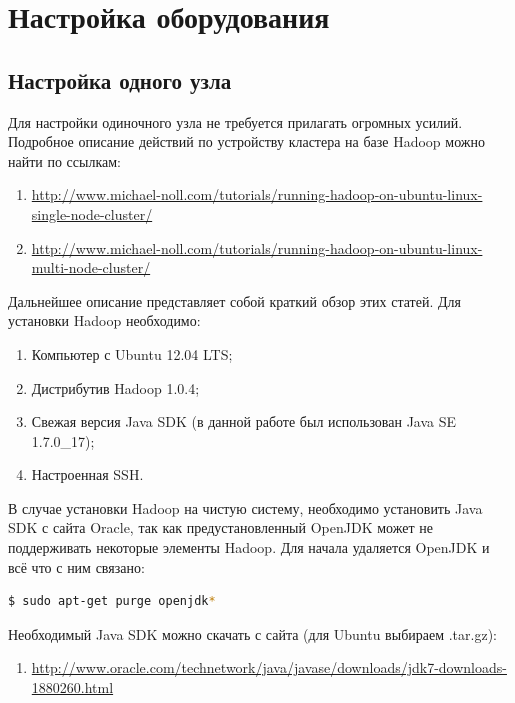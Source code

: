 \documentclass[12pt,a4paper]{extarticle} %
\begin{document}
\clearpage\newpage
\section{Настройка оборудования} \label{sec:TuningCluster}
\subsection{Настройка одного узла}

    Для настройки одиночного узла не требуется прилагать огромных усилий. Подробное описание действий по устройству кластера на базе Hadoop можно найти по ссылкам:
\begin{enumerate}
    \item[] \href{http://www.michael-noll.com/tutorials/running-hadoop-on-ubuntu-linux-single-node-cluster/}{http://www.michael-noll.com/tutorials/running-hadoop-on-ubuntu-linux-single-node-cluster/}
    \item[] \href{http://www.michael-noll.com/tutorials/running-hadoop-on-ubuntu-linux-multi-node-cluster/}{http://www.michael-noll.com/tutorials/running-hadoop-on-ubuntu-linux-multi-node-cluster/}
\end{enumerate}

    Дальнейшее описание представляет собой краткий обзор этих статей. Для установки Hadoop необходимо:
\begin{enumerate}
    \item Компьютер с Ubuntu 12.04 LTS;
    \item Дистрибутив Hadoop 1.0.4;
    \item Свежая версия Java SDK (в данной работе был использован Java SE 1.7.0\_17);
    \item Настроенная SSH.
\end{enumerate}

    В случае установки Hadoop на чистую систему, необходимо установить Java SDK с сайта Oracle, так как предустановленный OpenJDK может не поддерживать некоторые элементы Hadoop.
\noindent Для начала удаляется OpenJDK и всё что с ним связано:
\begin{lstlisting}[language=sh]
    $ sudo apt-get purge openjdk*
\end{lstlisting}

\noindent Необходимый Java SDK можно скачать с сайта (для Ubuntu выбираем .tar.gz):
\begin{enumerate}
    \item[] \href{http://www.oracle.com/technetwork/java/javase/downloads/jdk7-downloads-1880260.html}{http://www.oracle.com/technetwork/java/javase/downloads/jdk7-downloads-1880260.html}
\end{enumerate}
\end{document}
